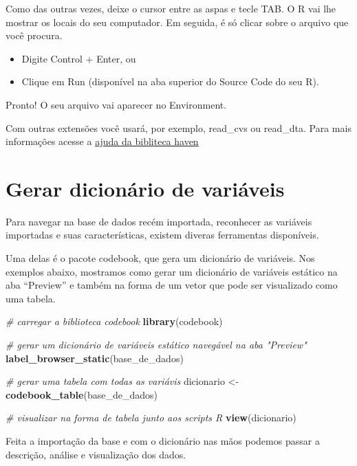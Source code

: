 \documentclass[
  brazil,
]{book}
\newenvironment{Shaded}{\begin{snugshade}}{\end{snugshade}}
\newcommand{\CommentTok}[1]{\textcolor[rgb]{0.56,0.35,0.01}{\textit{#1}}}
\newcommand{\KeywordTok}[1]{\textcolor[rgb]{0.13,0.29,0.53}{\textbf{#1}}}
\newcommand{\NormalTok}[1]{#1}
\newcommand{\StringTok}[1]{\textcolor[rgb]{0.31,0.60,0.02}{#1}}
\providecommand{\tightlist}{%
  \setlength{\itemsep}{0pt}\setlength{\parskip}{0pt}}
\begin{document}
Como das outras vezes, deixe o cursor entre as aspas e tecle TAB. O R vai lhe mostrar os locais do seu computador. Em seguida, é só clicar sobre o arquivo que você procura.

\begin{itemize}
\tightlist
\item
  Digite Control + Enter, ou
\item
  Clique em Run (disponível na aba superior do Source Code do seu R).
\end{itemize}

Pronto! O seu arquivo vai aparecer no Environment.

Com outras extensões você usará, por exemplo, read\_cvs ou read\_dta. Para mais informações acesse a \href{https://haven.tidyverse.org/}{ajuda da bibliteca haven}

\hypertarget{gerar-dicionuxe1rio-de-variuxe1veis}{%
\section{Gerar dicionário de variáveis}\label{gerar-dicionuxe1rio-de-variuxe1veis}}

Para navegar na base de dados recém importada, reconhecer as variáveis importadas e suas características, existem diveras ferramentas disponíveis.

Uma delas é o pacote codebook, que gera um dicionário de variáveis. Nos exemplos abaixo, mostramos como gerar um dicionário de variáveis estático na aba ``Preview'' e também na forma de um vetor que pode ser visualizado como uma tabela.

\begin{Shaded}
\begin{Highlighting}[]
\CommentTok{# carregar a biblioteca codebook}
\KeywordTok{library}\NormalTok{(codebook)}

\CommentTok{# gerar um dicionário de variáveis estático navegável na aba "Preview"}
\KeywordTok{label_browser_static}\NormalTok{(base_de_dados)}

\CommentTok{# gerar uma tabela com todas as variávis}
\NormalTok{dicionario <-}\StringTok{ }\KeywordTok{codebook_table}\NormalTok{(base_de_dados)}

\CommentTok{# visualizar na forma de tabela junto aos scripts R}
\KeywordTok{view}\NormalTok{(dicionario)}
\end{Highlighting}
\end{Shaded}

Feita a importação da base e com o dicionário nas mãos podemos passar a descrição, análise e visualização dos dados.
\end{document}
